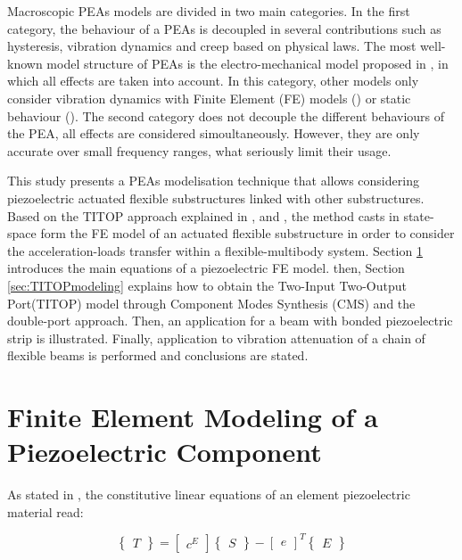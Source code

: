 \documentclass{ifacconf}
\begin{document}
Macroscopic PEAs models  are divided in two main categories. In the first category, the behaviour of a PEAs is decoupled in several contributions such as hysteresis, vibration dynamics and creep based on physical laws. The most well-known model structure of PEAs is the electro-mechanical model proposed in \cite{Goldfarb1997_PEA}, in which all effects are taken into account. In this category, other models only consider vibration dynamics with Finite Element (FE) models (\cite{Piefort2000_PEA}) or static behaviour (\cite{Smits1991_PEA}). The second category does not decouple the different behaviours of the PEA, all effects are considered simoultaneously. However, they are only accurate over small frequency ranges, what seriously limit their usage.

This study presents a PEAs modelisation technique that allows considering piezoelectric actuated flexible substructures linked with other substructures. Based on the TITOP approach explained in \cite{Perez2015_LM}, \cite{Alazard2015_LM} and \cite{Perez_IFAtheory2015}, the method casts in state-space form the FE model of an actuated flexible substructure in order to consider the acceleration-loads transfer within a flexible-multibody system. Section \ref{sec:finite element} introduces the main equations of a piezoelectric FE model. then, Section \ref{sec:TITOPmodeling} explains how to obtain the Two-Input Two-Output Port(TITOP) model through Component Modes Synthesis (CMS) and the double-port approach. Then, an application for a beam with bonded piezoelectric strip is illustrated. Finally, application to vibration attenuation of a chain of flexible beams is performed and conclusions are stated. 


\section{Finite Element Modeling of a Piezoelectric Component}
\label{sec:finite element}

As stated in \cite{Ansi1988_PEA}, the constitutive linear equations of an element piezoelectric material read:

\begin{equation}
\begin{Bmatrix} T \end{Bmatrix} = \begin{bmatrix} c^E
\end{bmatrix}\begin{Bmatrix} S \end{Bmatrix} - \begin{bmatrix} e \end{bmatrix}^T \begin{Bmatrix} E \end{Bmatrix}
\end{equation} 
\end{document}
